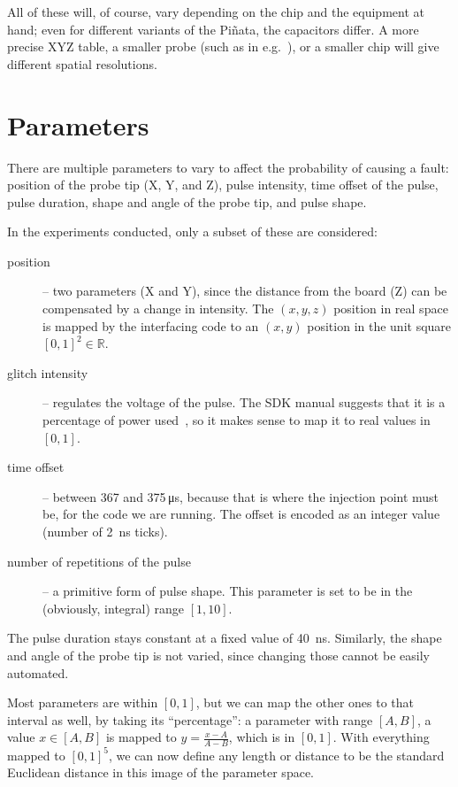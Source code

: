 \documentclass[times, utf8, diplomski]{fer}
\begin{document}
All of these will, of course, vary depending on the chip and the equipment at
hand; even for different variants of the Piñata, the capacitors differ.
A more precise XYZ table, a smaller probe (such as in e.g.~\cite{ordas2015injection}),
or a smaller chip will give different spatial resolutions.


\section{Parameters}\label{sec:parameters}
There are multiple parameters to vary to affect the probability of causing a
fault: position of the probe tip (X, Y, and Z), pulse intensity, time offset
of the pulse, pulse duration, shape and angle of the probe tip, and pulse shape.

In the experiments conducted, only a subset of these are considered:
\begin{description}
  \item[position] -- two parameters (X and Y), since the distance from the board
        (Z) can be compensated by a change in intensity. The $(x,y,z)$ position
        in real space is mapped by the interfacing code to an $(x,y)$ position
        in the unit square $[0,1]^2 \in \mathbb{R}$.
  \item[glitch intensity] -- regulates the voltage of the pulse. The SDK manual
        suggests that it is a percentage of power used~\cite{RiscureVCGmanual},
        so it makes sense to map it to real values in $[0,1]$.
  \item[time offset] -- between 367 and 375\,\si{\micro\second}, because that is
        where the injection point must be, for the code we are running. The offset
        is encoded as an integer value (number of \SI{2}{\nano\second} ticks).
  \item[number of repetitions of the pulse] -- a primitive form of pulse shape.
        This parameter is set to be in the (obviously, integral) range $[1, 10]$.
\end{description}

The pulse duration stays constant at a fixed value of \SI{40}{\nano\second}.
Similarly, the shape and angle of the probe tip is not varied, since changing
those cannot be easily automated.

Most parameters are within $[0,1]$, but we can map the other ones to that
interval as well, by taking its ``percentage'': a parameter with range $[A,B]$,
a value $x \in [A,B]$ is mapped to $y = \frac{x-A}{A-B}$, which is in $[0,1]$.
With everything mapped to $[0,1]^5$, we can now define any length or distance
to be the standard Euclidean distance in this image of the parameter space.
\end{document}

